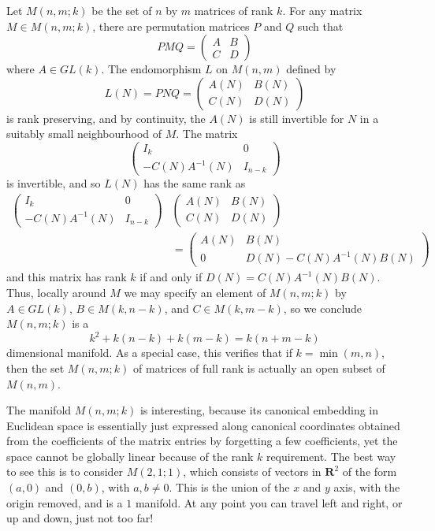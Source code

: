 \begin{example}
    Let $M(n,m;k)$ be the set of $n$ by $m$ matrices of rank $k$. For any matrix $M \in M(n,m;k)$, there are permutation matrices $P$ and $Q$ such that
    \[ PMQ = \begin{pmatrix} A & B \\ C & D \end{pmatrix} \]
    where $A \in GL(k)$. The endomorphism $L$ on $M(n,m)$ defined by
    \[ L(N) = PNQ = \begin{pmatrix} A(N) & B(N) \\ C(N) & D(N) \end{pmatrix} \]
    is rank preserving, and by continuity, the $A(N)$ is still invertible for $N$ in a suitably small neighbourhood of $M$. The matrix
    \[ \begin{pmatrix} I_k & 0 \\ -C(N)A^{-1}(N) & I_{n-k} \end{pmatrix} \]
    is invertible, and so $L(N)$ has the same rank as
    \begin{align*}
        \begin{pmatrix} I_k & 0 \\ -C(N)A^{-1}(N) & I_{n-k} \end{pmatrix} &\begin{pmatrix} A(N) & B(N) \\ C(N) & D(N) \end{pmatrix}\\
        &= \begin{pmatrix} A(N) & B(N) \\ 0 & D(N) - C(N)A^{-1}(N)B(N) \end{pmatrix}
    \end{align*}
    and this matrix has rank $k$ if and only if $D(N) = C(N)A^{-1}(N)B(N)$. Thus, locally around $M$ we may specify an element of $M(n,m;k)$ by $A \in GL(k)$, $B \in M(k,n-k)$, and $C \in M(k,m-k)$, so we conclude $M(n,m;k)$ is a
    \[ k^2 + k(n-k) + k(m-k) = k(n+m-k) \]
    dimensional manifold. As a special case, this verifies that if $k = \min(m,n)$, then the set $M(n,m;k)$ of matrices of full rank is actually an open subset of $M(n,m)$.
\end{example}

The manifold $M(n,m;k)$ is interesting, because its canonical embedding in Euclidean space is essentially just expressed along canonical coordinates obtained from the coefficients of the matrix entries by forgetting a few coefficients, yet the space cannot be globally linear because of the rank $k$ requirement. The best way to see this is to consider $M(2,1;1)$, which consists of vectors in $\mathbf{R}^2$ of the form $(a,0)$ and $(0,b)$, with $a,b \neq 0$. This is the union of the $x$ and $y$ axis, with the origin removed, and is a $1$ manifold. At any point you can travel left and right, or up and down, just not too far!

